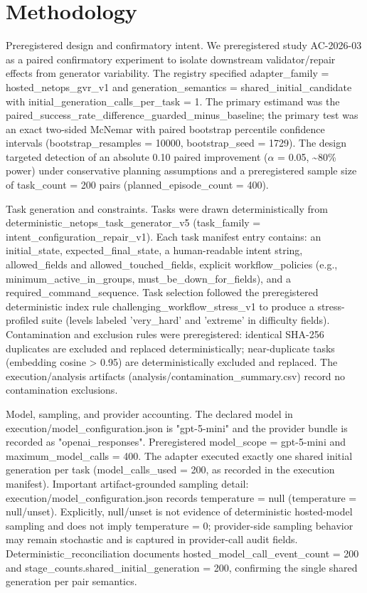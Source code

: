 \documentclass[conference]{IEEEtran}
\begin{document}
\section{Methodology}
Preregistered design and confirmatory intent. We preregistered study AC-2026-03 as a paired confirmatory experiment to isolate downstream validator/repair effects from generator variability. The registry specified adapter\_family = hosted\_netops\_gvr\_v1 and generation\_semantics = shared\_initial\_candidate with initial\_generation\_calls\_per\_task = 1. The primary estimand was the paired\_success\_rate\_difference\_guarded\_minus\_baseline; the primary test was an exact two-sided McNemar with paired bootstrap percentile confidence intervals (bootstrap\_resamples = 10000, bootstrap\_seed = 1729). The design targeted detection of an absolute 0.10 paired improvement (\ensuremath{\alpha} = 0.05, \textasciitilde{}80\% power) under conservative planning assumptions and a preregistered sample size of task\_count = 200 pairs (planned\_episode\_count = 400).

Task generation and constraints. Tasks were drawn deterministically from deterministic\_netops\_task\_generator\_v5 (task\_family = intent\_configuration\_repair\_v1). Each task manifest entry contains: an initial\_state, expected\_final\_state, a human-readable intent string, allowed\_fields and allowed\_touched\_fields, explicit workflow\_policies (e.g., minimum\_active\_in\_groups, must\_be\_down\_for\_fields), and a required\_command\_sequence. Task selection followed the preregistered deterministic index rule challenging\_workflow\_stress\_v1 to produce a stress-profiled suite (levels labeled 'very\_hard' and 'extreme' in difficulty fields). Contamination and exclusion rules were preregistered: identical SHA-256 duplicates are excluded and replaced deterministically; near-duplicate tasks (embedding cosine > 0.95) are deterministically excluded and replaced. The execution/analysis artifacts (analysis/contamination\_summary.csv) record no contamination exclusions.

Model, sampling, and provider accounting. The declared model in execution/model\_configuration.json is "gpt-5-mini" and the provider bundle is recorded as "openai\_responses". Preregistered model\_scope = gpt-5-mini and maximum\_model\_calls = 400. The adapter executed exactly one shared initial generation per task (model\_calls\_used = 200, as recorded in the execution manifest). Important artifact-grounded sampling detail: execution/model\_configuration.json records temperature = null (temperature = null/unset). Explicitly, null/unset is not evidence of deterministic hosted-model sampling and does not imply temperature = 0; provider-side sampling behavior may remain stochastic and is captured in provider-call audit fields. Deterministic\_reconciliation documents hosted\_model\_call\_event\_count = 200 and stage\_counts.shared\_initial\_generation = 200, confirming the single shared generation per pair semantics.
\end{document}
